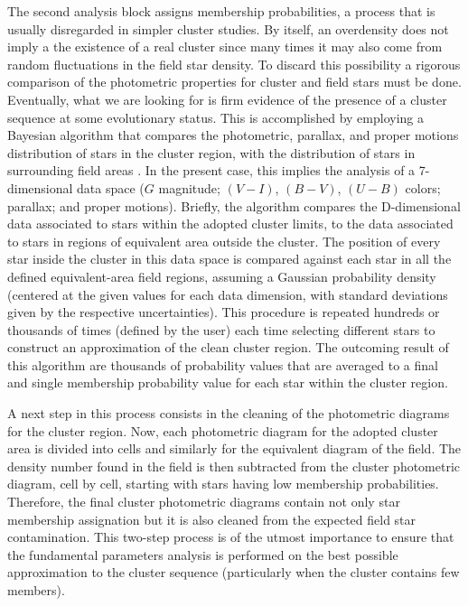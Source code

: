 \documentclass[draft]{aa}
\begin{document}
The second analysis block assigns membership probabilities, a process that is
usually disregarded in simpler cluster studies. By itself, an
overdensity does not imply a the existence of a real cluster since many times
it may also come from random fluctuations in the field star density. To discard
this possibility a rigorous comparison of the photometric
properties for cluster and field stars must be done. Eventually, what we
are looking for is firm evidence of the presence of a cluster sequence at some
evolutionary status. This is accomplished by employing a Bayesian algorithm that
compares the photometric, parallax, and proper motions distribution of stars
in the cluster region, with the distribution of stars in surrounding field
areas \citep{Perren_2015}. In the present case, this implies the analysis
of a 7-dimensional data space ($G$ magnitude; $(V-I)$, $(B-V)$, $(U-B)$
colors; parallax; and proper motions).
%
Briefly, the algorithm compares the D-dimensional data associated to stars
within the adopted cluster limits, to the data associated to stars in regions
of equivalent area outside the cluster.
The position of every star inside the cluster in this data space
is compared against each star in all the defined equivalent-area field regions,
assuming a Gaussian probability density (centered at the given values for each
data dimension, with standard deviations given by the respective
uncertainties). This procedure is repeated hundreds or thousands of times 
(defined by the user) each time selecting different stars to construct an
approximation of the clean cluster region. The outcoming result of this
algorithm are thousands of probability values that are averaged to a final and
single membership probability value for each star within the cluster region.

A next step in this process consists in the cleaning of the photometric
diagrams for the cluster region. Now, each photometric diagram for the adopted
cluster area is divided into cells and similarly for the equivalent diagram of
the field. The density number found in the field is then subtracted from the
cluster photometric diagram, cell by cell, starting with stars having low
membership probabilities. Therefore, the final cluster photometric diagrams
contain not only star membership assignation but it is also cleaned from the
expected field star contamination. This two-step process is of the utmost
importance to ensure that the fundamental parameters analysis is performed on
the best possible approximation to the cluster sequence (particularly when
the cluster contains few members).\\
\end{document}
